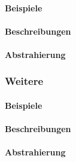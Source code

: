 \paragraph*{Beispiele}
\paragraph*{Beschreibungen}
\paragraph*{Abstrahierung}

\subsubsection{Weitere}
\paragraph*{Beispiele}
\paragraph*{Beschreibungen}
\paragraph*{Abstrahierung}
